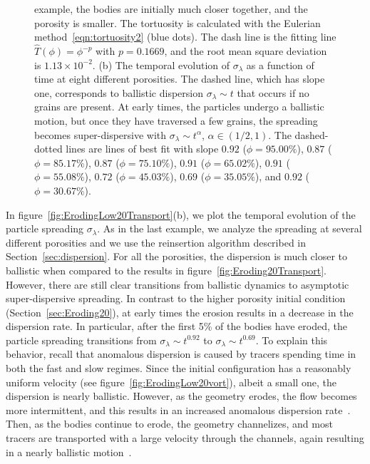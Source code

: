 \documentclass{jfm}
\begin{document}
\begin{figure}
{example, the bodies are initially much closer together, and the porosity
is smaller.  The tortuosity is calculated with the Eulerian
method~\eqref{eqn:tortuosity2} (blue dots).  The dash line is the
fitting line $\widehat{T}(\phi)=\phi^{-p}$ with $p=0.1669$, and the root
mean square deviation is $1.13 \times 10^{-2}$.  (b) The temporal
evolution of $\sigma_\lambda$ as a function of time at eight different
porosities.  The dashed line, which has slope one, corresponds to
ballistic dispersion $\sigma_\lambda \sim t$ that occurs if no grains
are present.  At early times, the particles undergo a ballistic motion,
but once they have traversed a few grains, the spreading becomes
super-dispersive with $\sigma_\lambda \sim t^{\alpha}$, $\alpha \in
(1/2,1)$.  The dashed-dotted lines are lines of best fit with slope
$0.92$ ($\phi=95.00\%$), $0.87$ ($\phi=85.17\%$), $0.87$
($\phi=75.10\%$), $0.91$ ($\phi=65.02\%$), $0.91$ ($\phi=55.08\%$),
$0.72$ ($\phi=45.03\%$), $0.69$ ($\phi=35.05\%$), and $0.92$
($\phi=30.67\%$).}
\end{figure}

In figure~\ref{fig:ErodingLow20Transport}(b), we plot the temporal
evolution of the particle spreading $\sigma_\lambda$.  As in the last
example, we analyze the spreading at several different porosities and we
use the reinsertion algorithm described in Section~\ref{sec:dispersion}.
For all the porosities, the dispersion is much closer to ballistic when
compared to the results in figure~\ref{fig:Eroding20Transport}.
However, there are still clear transitions from ballistic dynamics to
asymptotic super-dispersive spreading.  In contrast to the higher
porosity initial condition (Section~\ref{sec:Eroding20}), at early times
the erosion results in a decrease in the dispersion rate. In particular,
after the first 5\% of the bodies have eroded, the particle spreading
transitions from $\sigma_\lambda \sim t^{0.92}$ to $\sigma_\lambda \sim
t^{0.69}$.  To explain this behavior, recall that anomalous dispersion
is caused by tracers spending time in both the fast and slow regimes.
Since the initial configuration has a reasonably uniform velocity (see
figure~\ref{fig:ErodingLow20vort}), albeit a small one, the dispersion
is nearly ballistic. However, as the geometry erodes, the flow becomes
more intermittent, and this results in an increased anomalous dispersion
rate~\citep{dea-leb-den-tar-bol-dav2013}.  Then, as the bodies continue
to erode, the geometry channelizes, and most tracers are transported
with a large velocity through the channels, again resulting in a nearly
ballistic motion~\citep{sie-ili-pri-riv-gua2019}.
\end{document}
